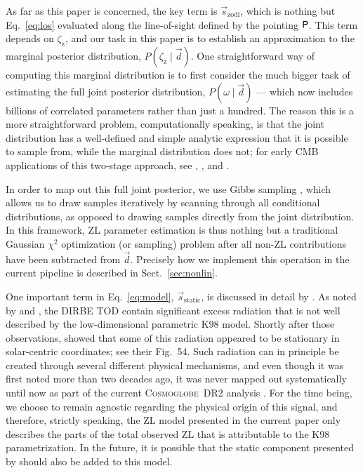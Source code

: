 \documentclass[twocolumn]{aa}
\newcommand{\dv}[0]{\vec{d}}
\newcommand{\s}[0]{\vec{s}}
\renewcommand{\P}[0]{\tens{P}}
\newcommand{\cosmoglobe}{\textsc{Cosmoglobe}}
\begin{document}
As far as this paper is concerned, the key term is
$\s_{\mathrm{zodi}}$, which is nothing but Eq.~\eqref{eq:los}
evaluated along the line-of-sight defined by the pointing $\P$. This
term depends on $\zeta_{\mathrm{z}}$, and our task in this paper is to
establish an approximation to the marginal posterior distribution,
$P(\zeta_{\mathrm{z}} \mid\dv)$. One straightforward way of computing this
marginal distribution is to first
consider the much bigger task of estimating the full joint posterior
distribution, $P(\omega \mid\dv)$ --- which now includes billions of
correlated parameters rather than just a hundred. The reason this is a 
more straightforward problem, computationally speaking, is that 
the joint distribution has a well-defined and simple analytic expression that it
is possible to sample from, while the marginal distribution does not;
for early CMB applications of this two-stage approach, see
\citet{jewell2004}, \citet{wandelt2004}, and \citet{eriksen:2004}.



In order to map out this full joint posterior, we use Gibbs 
sampling \citep[e.g.,][]{geman:1984}, which allows
us to draw samples iteratively by scanning through all conditional
distributions, as opposed to drawing samples directly from the joint
distribution. In this framework, ZL parameter estimation is
thus nothing but a traditional Gaussian $\chi^2$ optimization (or
sampling) problem after all non-ZL contributions have been subtracted
from $\dv$. Precisely how we implement this operation in the
current pipeline is described in Sect.~\ref{sec:nonlin}.


One important term in
Eq.~\eqref{eq:model}, $\s_{\mathrm{static}}$, is
discussed in detail by \citet{CG02_01}.  As noted by
\citet{hauser1998} and \citet{kelsall1998}, the DIRBE TOD contain
significant excess radiation that is not well described by the
low-dimensional parametric K98 model. Shortly after those
observations, \citet{leinert:1998} showed that some of this radiation
appeared to be stationary in solar-centric coordinates; see their
Fig.~54. Such radiation can in principle be created through several
different physical mechanisms, and 
even though it was first noted more than two decades ago, it was never mapped out
systematically until now as part of the current \cosmoglobe\ DR2
analysis \citep{CG02_01}. For the time being, we choose to remain
agnostic regarding the physical origin of this signal, and therefore,
strictly speaking, the ZL model presented in the current paper only
describes the parts of the total observed ZL that is attributable to
the K98 parametrization. In the future, it is possible that the static
component presented by \citet{CG02_01} should also be added to this
model. 
\end{document}
